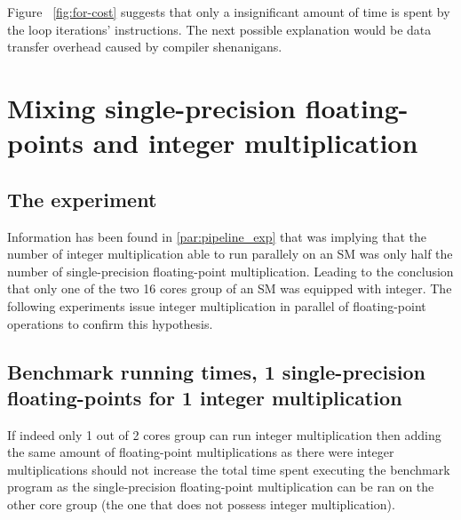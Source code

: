 \documentclass{report}
\begin{document}
    Figure ~\ref{fig:for-cost} suggests that only a insignificant amount of time is spent by the loop
    iterations' instructions. The next possible explanation would be data transfer overhead caused
    by compiler shenanigans.

\section{Mixing single-precision floating-points and integer multiplication}
	\subsection{The experiment}
	Information has been found in \ref{par:pipeline_exp} that was implying that the number of 
    integer multiplication able to run parallely on an SM was only half the number of 
    single-precision floating-point multiplication. Leading to the conclusion that only one of
    the two 16 cores group of an SM was equipped with integer. The following experiments issue 
    integer multiplication in parallel of floating-point operations to confirm this hypothesis.
	\subsection{Benchmark running times, 1 single-precision floating-points for 1 integer multiplication}
	If indeed only 1 out of 2 cores group can run integer multiplication then
    adding the same amount of floating-point multiplications as there were integer
    multiplications should not increase the total time spent executing the benchmark 
    program as the single-precision floating-point multiplication can
    be ran on the other core group (the one that does not possess integer multiplication).
	
\end{document}
